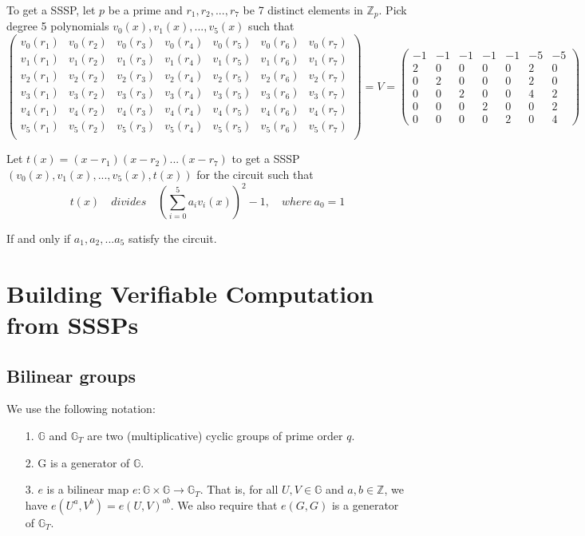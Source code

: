 \documentclass[lnbip]{svmultln}
\begin{document}
To get a SSSP, let $p$ be a prime and $r_1,r_2,...,r_7$ be 7 distinct elements in $\mathbb{Z}_p$. Pick degree 5 polynomials $v_0(x),v_1(x),...,v_5(x)$ such that
$$
\begin{pmatrix} 
v_0(r_1) & v_0(r_2) & v_0(r_3) & v_0(r_4) & v_0(r_5) & v_0(r_6) & v_0(r_7) \\
v_1(r_1) & v_1(r_2) & v_1(r_3) & v_1(r_4) & v_1(r_5) & v_1(r_6) & v_1(r_7) \\
v_2(r_1) & v_2(r_2) & v_2(r_3) & v_2(r_4) & v_2(r_5) & v_2(r_6) & v_2(r_7) \\
v_3(r_1) & v_3(r_2) & v_3(r_3) & v_3(r_4) & v_3(r_5) & v_3(r_6) & v_3(r_7) \\
v_4(r_1) & v_4(r_2) & v_4(r_3) & v_4(r_4) & v_4(r_5) & v_4(r_6) & v_4(r_7) \\
v_5(r_1) & v_5(r_2) & v_5(r_3) & v_5(r_4) & v_5(r_5) & v_5(r_6) & v_5(r_7) \\
\end{pmatrix}
= V =
\begin{pmatrix} 
-1 & -1 & -1 & -1 & -1 & -5 & -5 \\
2 & 0 & 0 & 0 & 0 & 2 & 0 \\
0 & 2 & 0 & 0 & 0 & 2 & 0 \\
0 & 0 & 2 & 0 & 0 & 4 & 2 \\
0 & 0 & 0 & 2 & 0 & 0 & 2 \\
0 & 0 & 0 & 0 & 2 & 0 & 4 
\end{pmatrix}
$$

Let $t(x)=(x-r_1)(x-r_2)...(x-r_7)$ to get a SSSP $(v_0(x),v_1(x),...,v_5(x),t(x))$ for the circuit such that
$$t(x)\quad divides\quad \left(\sum\limits_{i=0}^5a_i v_i(x)\right)^2-1, \quad where ~ a_0=1$$

If and only if $a_1,a_2,...a_5$ satisfy the circuit.


\section{Building Verifiable Computation from SSSPs}


\subsection{Bilinear groups}
We use the following notation\cite{boneh2005evaluating}:
\begin{itemize}
	\item[1.] $\mathbb{G}$ and $\mathbb{G}_T$ are two (multiplicative) cyclic groups of prime order $q$.
	\item[2.] G is a generator of $\mathbb{G}$.
	\item[3.] $e$ is a bilinear map $e:\mathbb{G} \times \mathbb{G} \rightarrow \mathbb{G}_T$. That is, for all $U,V \in \mathbb{G}$ and $a,b \in \mathbb{Z}$, we have $e(U^a,V^b)=e(U,V)^{ab}.$ We also require that $e(G,G)$ is a generator of $\mathbb{G}_T$.
\end{itemize}
\end{document}

